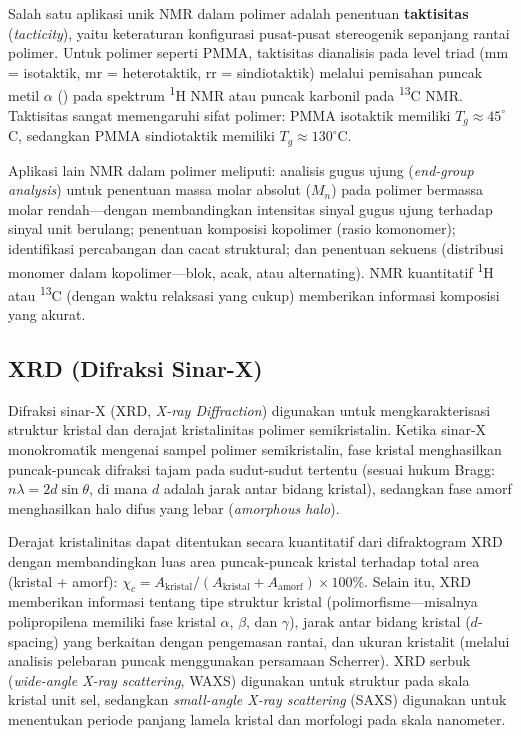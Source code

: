 \documentclass[12pt,a4paper,openany]{book}
\begin{document}
Salah satu aplikasi unik NMR dalam polimer adalah penentuan \textbf{taktisitas} (\textit{tacticity}), yaitu keteraturan konfigurasi pusat-pusat stereogenik sepanjang rantai polimer. Untuk polimer seperti PMMA, taktisitas dianalisis pada level triad (mm = isotaktik, mr = heterotaktik, rr = sindiotaktik) melalui pemisahan puncak metil $\alpha$ () pada spektrum \textsuperscript{1}H NMR atau puncak karbonil pada \textsuperscript{13}C NMR. Taktisitas sangat memengaruhi sifat polimer: PMMA isotaktik memiliki $T_g \approx 45^\circ$C, sedangkan PMMA sindiotaktik memiliki $T_g \approx 130^\circ$C.

Aplikasi lain NMR dalam polimer meliputi: analisis gugus ujung (\textit{end-group analysis}) untuk penentuan massa molar absolut ($M_n$) pada polimer bermassa molar rendah---dengan membandingkan intensitas sinyal gugus ujung terhadap sinyal unit berulang; penentuan komposisi kopolimer (rasio komonomer); identifikasi percabangan dan cacat struktural; dan penentuan sekuens (distribusi monomer dalam kopolimer---blok, acak, atau alternating). NMR kuantitatif \textsuperscript{1}H atau \textsuperscript{13}C (dengan waktu relaksasi yang cukup) memberikan informasi komposisi yang akurat.

\subsection{XRD (Difraksi Sinar-X)}

Difraksi sinar-X (XRD, \textit{X-ray Diffraction}) digunakan untuk mengkarakterisasi struktur kristal dan derajat kristalinitas polimer semikristalin. Ketika sinar-X monokromatik mengenai sampel polimer semikristalin, fase kristal menghasilkan puncak-puncak difraksi tajam pada sudut-sudut tertentu (sesuai hukum Bragg: $n\lambda = 2d\sin\theta$, di mana $d$ adalah jarak antar bidang kristal), sedangkan fase amorf menghasilkan halo difus yang lebar (\textit{amorphous halo}).

Derajat kristalinitas dapat ditentukan secara kuantitatif dari difraktogram XRD dengan membandingkan luas area puncak-puncak kristal terhadap total area (kristal + amorf): $\chi_c = A_{\text{kristal}} / (A_{\text{kristal}} + A_{\text{amorf}}) \times 100\%$. Selain itu, XRD memberikan informasi tentang tipe struktur kristal (polimorfisme---misalnya polipropilena memiliki fase kristal $\alpha$, $\beta$, dan $\gamma$), jarak antar bidang kristal ($d$-spacing) yang berkaitan dengan pengemasan rantai, dan ukuran kristalit (melalui analisis pelebaran puncak menggunakan persamaan Scherrer). XRD serbuk (\textit{wide-angle X-ray scattering}, WAXS) digunakan untuk struktur pada skala kristal unit sel, sedangkan \textit{small-angle X-ray scattering} (SAXS) digunakan untuk menentukan periode panjang lamela kristal dan morfologi pada skala nanometer.
\end{document}
